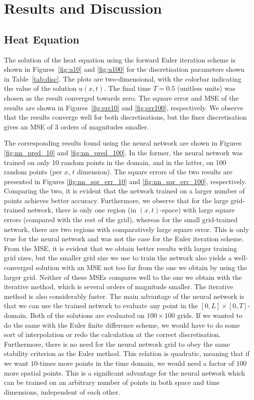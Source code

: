 \documentclass[a4paper, 
amsfonts, 
amssymb, 
amsmath, 
reprint, 
showkeys, 
nofootinbib, 
twoside]{revtex4-2}
\begin{document}
\section{Results and Discussion}
\label{results}

\subsection{ Heat Equation }

The solution of the heat equation using the forward Euler iteration scheme is shown in Figures~\ref{fig:u10} and \ref{fig:u100} for the discretisation parameters shown in Table~\ref{tab:disc}. The plots are two-dimensional, with the colorbar indicating the value of the solution $u(x, t)$. The final time $T = 0.5$ (unitless units) was chosen as the result converged towards zero. The square error and MSE of the results are shown in Figures~\ref{fig:err10} and \ref{fig:err100}, respectively. We observe that the results converge well for both discretisations, but the finer discretisation gives an MSE of 3 orders of magnitudes smaller. 

The corresponding results found using the neural network are shown in Figures \ref{fig:nn_pred_10} and \ref{fig:nn_pred_100}. In the former, the neural network was trained on only 10 random points in the domain, and in the latter, on 100 random points (per $x$, $t$ dimension). The square errors of the two results are presented in Figures \ref{fig:nn_sqr_err_10} and \ref{fig:nn_sqr_err_100}, respectively.  
Comparing the two, it is evident that the network trained on a larger number of points achieves better accuracy. Furthermore, we observe that for the large grid-trained network, there is only one region (in $(x, t)$-space) with large square errors (compared with the rest of the grid), whereas for the small grid-trained network, there are two regions with comparatively large square error. This is only true for the neural network and was not the case for the Euler iteration scheme. From the MSE, it is evident that we obtain better results with larger training grid sizes, but the smaller grid size we use to train the network also yields a well-converged solution with an MSE not too far from the one we obtain by using the larger grid. Neither of these MSEs compares well to the one we obtain with the iterative method, which is several orders of magnitude smaller. The iterative method is also considerably faster. 
The main advantage of the neural network is that we can use the trained network to evaluate any point in the $[0, L] \times [0, T]$-domain. Both of the solutions are evaluated on $100 \times 100$ grids. If we wanted to do the same with the Euler finite difference scheme, we would have to do some sort of interpolation or redo the calculation at the correct discretisation. Furthermore, there is no need for the neural network grid to obey the same stability criterion as the Euler method. This relation is quadratic, meaning that if we want $10$-times more points in the time domain, we would need a factor of $100$ more spatial points. This is a significant advantage for the neural network which can be trained on an arbitrary number of points in both space and time dimensions, independent of each other.    
\end{document}
